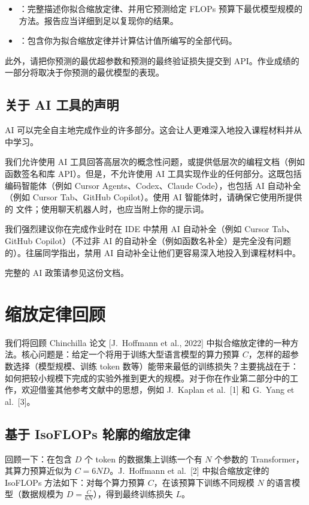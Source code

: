 \begin{itemize}
  \item {}：完整描述你拟合缩放定律、并用它预测给定 FLOPs 预算下最优模型规模的方法。报告应当详细到足以复现你的结果。
  \item {}：包含你为拟合缩放定律并计算估计值所编写的全部代码。
\end{itemize}

此外，请把你预测的最优超参数和预测的最终验证损失提交到 API。作业成绩的一部分将取决于你预测的最优模型的表现。

\subsection*{关于 AI 工具的声明}

AI 可以完全自主地完成作业的许多部分。这会让人更难深入地投入课程材料并从中学习。

我们允许使用 AI 工具回答高层次的概念性问题，或提供低层次的编程文档（例如函数签名和库 API）。但是，不允许使用 AI 工具实现作业的任何部分。这既包括编码智能体（例如 Cursor Agents、Codex、Claude Code），也包括 AI 自动补全（例如 Cursor Tab、GitHub Copilot）。使用 AI 智能体时，请确保它使用所提供的  文件；使用聊天机器人时，也应当附上你的提示词。

我们强烈建议你在完成作业时在 IDE 中禁用 AI 自动补全（例如 Cursor Tab、GitHub Copilot）（不过非 AI 的自动补全（例如函数名补全）是完全没有问题的）。往届同学指出，禁用 AI 自动补全让他们更容易深入地投入到课程材料中。

完整的 AI 政策请参见这份文档。

\section{缩放定律回顾}

我们将回顾 Chinchilla 论文 [J.~Hoffmann et al., 2022] 中拟合缩放定律的一种方法。核心问题是：给定一个将用于训练大型语言模型的算力预算 $C$，怎样的超参数选择（模型规模、训练 token 数等）能带来最低的训练损失？主要挑战在于：如何把较小规模下完成的实验外推到更大的规模。对于你在作业第二部分中的工作，欢迎借鉴其他参考文献中的思想，例如 J.~Kaplan et al.~[1] 和 G.~Yang et al.~[3]。

\subsection{基于 IsoFLOPs 轮廓的缩放定律}

回顾一下：在包含 $D$ 个 token 的数据集上训练一个有 $N$ 个参数的 Transformer，其算力预算近似为 $C = 6ND$。J.~Hoffmann et al.~[2] 中拟合缩放定律的 IsoFLOPs 方法如下：对每个算力预算 $C$，在该预算下训练不同规模 $N$ 的语言模型（数据规模为 $D = \frac{C}{6N}$），得到最终训练损失 $L$。

